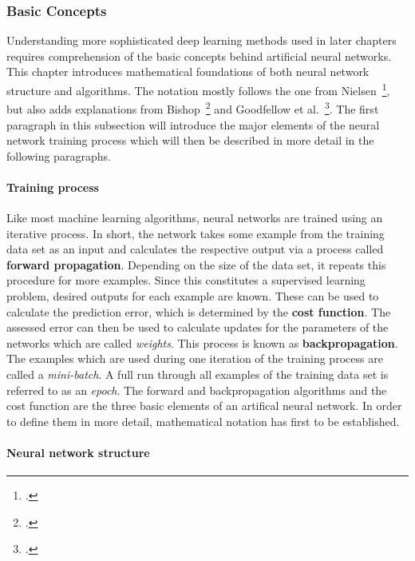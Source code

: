 \subsubsection{Basic Concepts}
\label{sub:dl_concepts}

Understanding more sophisticated deep learning methods used in later
chapters requires comprehension of the basic concepts behind artificial
neural networks.
This chapter introduces mathematical foundations of both neural network
structure and algorithms.
The notation mostly follows the one from Nielsen~\footcite{Nielsen2015}, but also
adds explanations from Bishop~\footcite{Bishop2006} and Goodfellow et al.~\footcite{Goodfellow2016}.
The first paragraph in this subsection will introduce the major elements
of the neural network training process which will then be described in more
detail in the following paragraphs.

\paragraph{Training process}

Like most machine learning algorithms, neural networks are trained using an iterative process.
In short, the network takes some example from the training data set as an input 
and calculates the respective output via a process called 
\textbf{forward propagation}.
Depending on the size of the data set, it repeats this procedure for more 
examples.
Since this constitutes a supervised learning problem, desired outputs for
each example are known.
These can be used to calculate the prediction error, which is determined by the
\textbf{cost function}.
The assessed error can then be used to calculate updates for the parameters of
the networks which are called \textit{weights}.
This process is known as \textbf{backpropagation}.
The examples which are used during one iteration of the training process are
called a \textit{mini-batch}.
A full run through all examples of the training data set is referred to as an
\textit{epoch}.
The forward and backpropagation algorithms and the cost function are the three
basic elements of an artifical neural network. 
In order to define them in more detail, mathematical notation has first to be
established.

\paragraph{Neural network structure}

